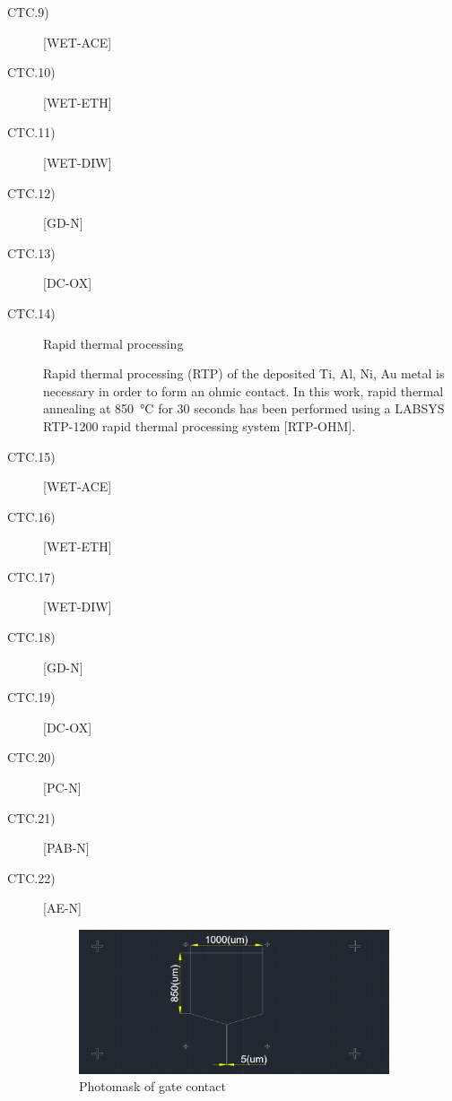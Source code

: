 \begin{description}
	\item[CTC.9)] [WET-ACE]
	
	\item[CTC.10)] [WET-ETH]
	
	\item[CTC.11)] [WET-DIW]
	
	\item[CTC.12)] [GD-N]
	
	\item[CTC.13)] [DC-OX]
	
	\item[CTC.14)] Rapid thermal processing
	
	Rapid  thermal  processing (RTP)  of the deposited Ti, Al, Ni, Au metal is necessary in order to form an  ohmic contact. In this work, rapid thermal annealing at \SI{850}{\degreeCelsius} for 30 seconds has been performed using a LABSYS RTP-1200 rapid thermal processing system [RTP-OHM].
	
	\item[CTC.15)] [WET-ACE]
	
	\item[CTC.16)] [WET-ETH]
	
	\item[CTC.17)] [WET-DIW]
	
	\item[CTC.18)] [GD-N]
	
	\item[CTC.19)] [DC-OX]
	
	\item[CTC.20)] [PC-N]
	\item[CTC.21)] [PAB-N]
	\item[CTC.22)] [AE-N]
	
\begin{figure}[H] 
\centering    
\includegraphics[width=0.9\textwidth]{gate}
\caption[Photomask of gate contact]{Photomask  of gate contact}
\label{fig:gate}
\end{figure}
	

\end{description}
